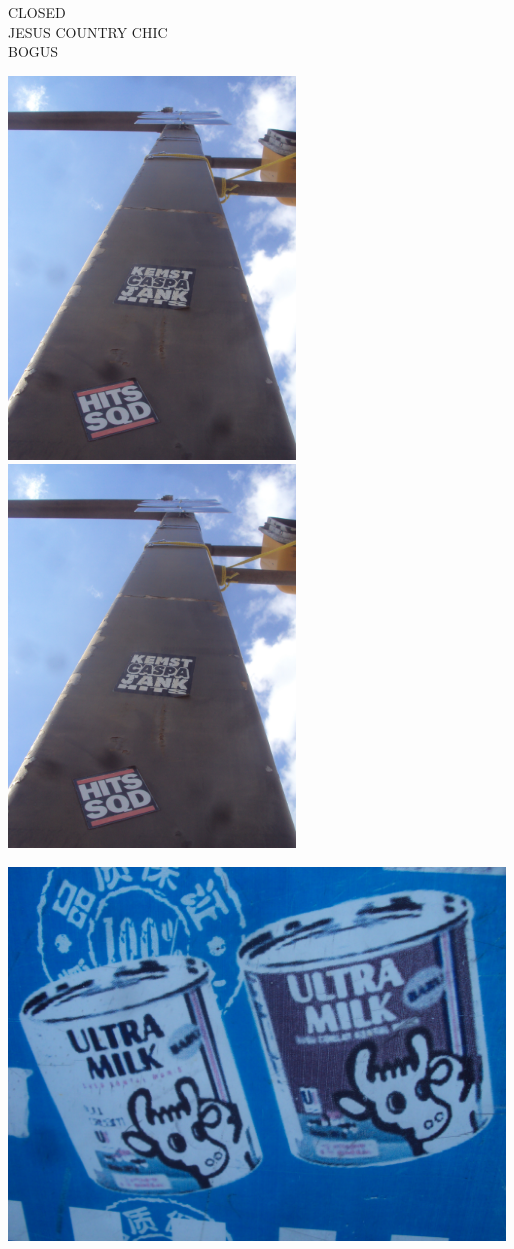 \documentclass[10pt,letterpaper]{article}
\begin{document}
CLOSED\\
JESUS COUNTRY CHIC\\
BOGUS\\
\pagebreak

\includegraphics[height=4in]{portrait.jpg}
\includegraphics[height=4in]{portrait.jpg}

\vspace{0.25in}
\includegraphics[width=5.19in]{landscape.jpg}
\end{document}
